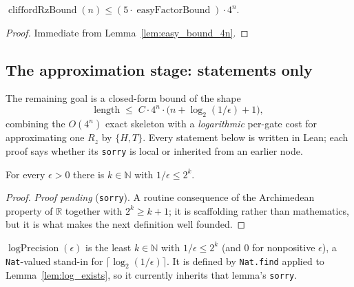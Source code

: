\begin{lemma}
  \label{lem:cliffordrz_bound_4n}
  \leanok
  $\operatorname{cliffordRzBound}(n)
    \le (5\cdot \operatorname{easyFactorBound})\cdot 4^{n}$.
\end{lemma}

\begin{proof}
  \leanok
  Immediate from Lemma~\ref{lem:easy_bound_4n}.
\end{proof}

\subsection{The approximation stage: statements only}

The remaining goal is a closed-form bound of the shape
\[
  \text{length} \;\le\; C \cdot 4^{n} \cdot
    \big(n + \log_2(1/\epsilon) + 1\big),
\]
combining the $O(4^n)$ exact skeleton with a \emph{logarithmic} per-gate cost
for approximating one $R_z$ by $\{H,T\}$.  Every statement below is written in
Lean; each proof says whether its \texttt{sorry} is local or inherited from an
earlier node.

\begin{lemma}
  \label{lem:log_exists}
  \leanok
  For every $\epsilon > 0$ there is $k \in \mathbb{N}$ with
  $1/\epsilon \le 2^{k}$.
\end{lemma}

\begin{proof}
  \emph{Proof pending} (\texttt{sorry}).  A routine consequence of the
  Archimedean property of $\mathbb{R}$ together with $2^k \ge k+1$; it is
  scaffolding rather than mathematics, but it is what makes the next definition
  well founded.
\end{proof}

\begin{definition}
  \label{def:log_precision}
  \leanok
  $\operatorname{logPrecision}(\epsilon)$ is the least $k \in \mathbb{N}$ with
  $1/\epsilon \le 2^{k}$ (and $0$ for nonpositive $\epsilon$), a
  \texttt{Nat}-valued stand-in for $\lceil \log_2(1/\epsilon)\rceil$.  It is
  defined by \texttt{Nat.find} applied to Lemma~\ref{lem:log_exists}, so it
  currently inherits that lemma's \texttt{sorry}.
\end{definition}

